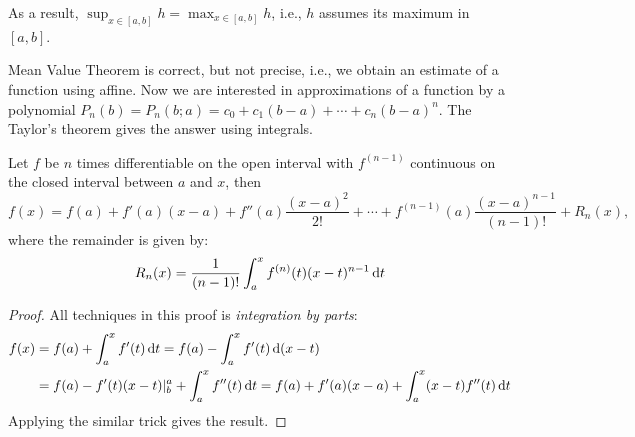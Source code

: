 As a result, $\sup_{x\in[a,b]}h=\max_{x\in[a,b]}h$, i.e., $h$ assumes its maximum in $[a,b]$.
\begin{remark}
Mean Value Theorem is correct, but not precise, i.e., 
we obtain an estimate of a function using affine. Now we are interested in approximations of a function by a polynomial $P_n(b)=P_n(b;a)=c_0+c_1(b-a)+\cdots+c_n(b-a)^n$. The Taylor's theorem gives the answer using integrals.
\end{remark}

\begin{theorem}
Let $f$ be $n$ times differentiable on the open interval with $f^{(n-1)}$ continuous on the closed interval between $a$ and $x$, then
\[
f(x) = f(a)+f'(a)(x-a)+f''(a)\frac{(x-a)^2}{2!}+\cdots+f^{(n-1)}(a)\frac{(x-a)^{n-1}}{(n-1)!}+R_n(x),
\]
where the remainder is given by:
\[
R_n(x)=\frac{1}{(n-1)!}\int_a^xf^{(n)}(t)(x-t)^{n-1}\,\mathrm{d} t
\]
\end{theorem}
\begin{proof}
All techniques in this proof is \emph{integration by parts}:
\begin{align*}
f(x) &= f(a)+\int_a^xf'(t)\,\mathrm{d} t=f(a)-\int_a^xf'(t)\,\mathrm{d} (x-t)\\
&=f(a)-f'(t)(x-t)|_{b}^{a}+\int_a^xf''(t)\,\mathrm{d} t=f(a)+
f'(a)(x-a)+\int_a^x(x-t)f''(t)\,\mathrm{d} t
\end{align*}
Applying the similar trick gives the result.
\end{proof}
